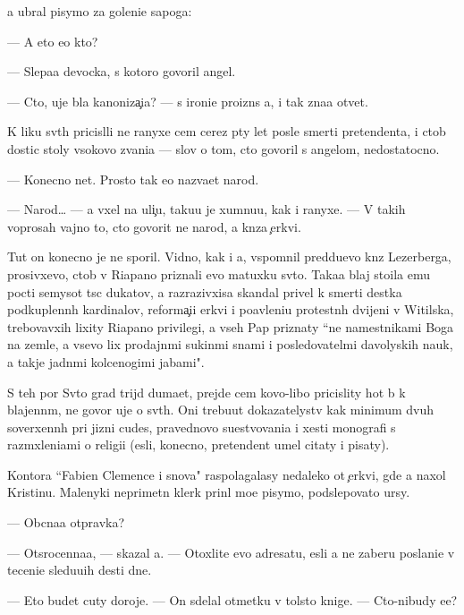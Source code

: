 \documentclass[10pt]{book}
\begin{document}
{\Y}a ubral pisymo za goleni{\x}e sapoga:

— A eto {\y}e{\x}o kto?

— Slepa{\y}a devocka, s kotoro{\y} govoril angel.

— Cto, uje b{\yi}la kanoniza{\c}i{\y}a? — s ironi{\y}e{\y} proizn{\e}s {\y}a, i tak zna{\y}a otvet.

K liku sv{\ia}t{\yi}h pricisl{\ia}li ne ranyxe cem cerez p{\ia}ty let posle smerti pretendenta, i ctob{\yi} dostic stoly v{\yi}sokovo zvani{\y}a — slov o tom, cto govoril s angelom, nedostatocno.

— Konecno net. Prosto tak {\y}e{\y}o naz{\yi}va{\y}et narod.

— Narod… — {\Y}a v{\yi}xel na uli{\c}u, taku{\y}u je xumnu{\y}u, kak i ranyxe. — V takih voprosah vajno to, cto govorit ne narod, a kn{\ia}z{\y}a {\c}erkvi.

Tut on konecno je ne sporil. Vidno, kak i {\y}a, vspomnil pred{\yi}du{\x}evo kn{\ia}z{\ia} Lezerberga, prosivxevo, ctob{\yi} v Riapano priznali {\y}evo matuxku sv{\ia}to{\y}. Taka{\y}a blaj sto{\y}ila {\y}emu pocti semysot t{\yi}s{\ia}c dukatov, a razrazivxi{\y}sa skandal privel k smerti des{\ia}tka podkuplenn{\yi}h kardinalov, reforma{\c}i{\y}i {\C}erkvi i po{\y}avleni{\y}u protestn{\yi}h dvijeni{\y} v Witilska, trebovavxih lixity Riapano privilegi{\y}, a vseh Pap priznaty ``ne namestnikami Boga na zemle, a vsevo lix prodajn{\yi}mi sukin{\yi}mi s{\yi}nami i posledovatel{\ia}mi d{\y}avolyskih nauk, a takje jadn{\yi}mi kolcenogimi jabami".

S teh por Sv{\ia}to{\y} grad trijd{\yi} duma{\y}et, prejde cem kovo-libo pricislity hot{\ia} b{\yi} k blajenn{\yi}m, ne govor{\ia} uje o sv{\ia}t{\yi}h. Oni trebu{\y}ut dokazatelystv kak minimum dvuh soverxenn{\yi}h pri jizni cudes, pravednovo su{\x}estvovani{\y}a i xesti monografi{\y} s razm{\yi}xleni{\y}ami o religi{\y}i ({\y}esli, konecno, pretendent umel citaty i pisaty).

Kontora ``Fabien Clemence i s{\yi}nov{\y}a" raspolagalasy nedaleko ot {\c}erkvi, gde {\y}a naxol Kristinu. Malenyki{\y} neprimetn{\yi}{\y} klerk prin{\ia}l mo{\y}e pisymo, podslepovato {\x}ur{\ia}sy.

— Ob{\yi}cna{\y}a otpravka?

— Otsrocenna{\y}a, — skazal {\y}a. — Otoxlite {\y}evo adresatu, {\y}esli {\y}a ne zaberu poslani{\y}e v teceni{\y}e sledu{\y}u{\x}ih des{\ia}ti dne{\y}.

— Eto budet cuty doroje. — On sdelal otmetku v tolsto{\y} knige. — Cto-nibudy {\y}e{\x}e?
\end{document}
